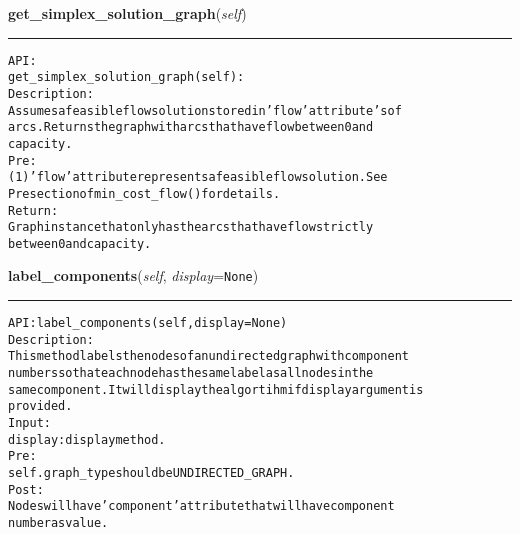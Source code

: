     \label{coinor:gimpy:graph:Graph:get_simplex_solution_graph}

    \vspace{0.5ex}

\hspace{.8\funcindent}\begin{boxedminipage}{\funcwidth}

    \raggedright \textbf{get\_simplex\_solution\_graph}(\textit{self})

    \vspace{-1.5ex}

    \rule{\textwidth}{0.5\fboxrule}
\setlength{\parskip}{2ex}
\begin{alltt}

API:
    get\_simplex\_solution\_graph(self):
Description:
    Assumes a feasible flow solution stored in 'flow' attribute's of
    arcs. Returns the graph with arcs that have flow between 0 and
    capacity.
Pre:
    (1) 'flow' attribute represents a feasible flow solution. See
    Pre section of min\_cost\_flow() for details.
Return:
    Graph instance that only has the arcs that have flow strictly
    between 0 and capacity.
\end{alltt}

\setlength{\parskip}{1ex}
    \end{boxedminipage}

    \label{coinor:gimpy:graph:Graph:label_components}

    \vspace{0.5ex}

\hspace{.8\funcindent}\begin{boxedminipage}{\funcwidth}

    \raggedright \textbf{label\_components}(\textit{self}, \textit{display}={\tt None})

    \vspace{-1.5ex}

    \rule{\textwidth}{0.5\fboxrule}
\setlength{\parskip}{2ex}
\begin{alltt}

API: label\_components(self, display=None)
Description:
This method labels the nodes of an undirected graph with component
numbers so that each node has the same label as all nodes in the
same component. It will display the algortihm if display argument is
provided.
Input:
    display: display method.
Pre:
    self.graph\_type should be UNDIRECTED\_GRAPH.
Post:
    Nodes will have 'component' attribute that will have component
    number as value.
\end{alltt}

\setlength{\parskip}{1ex}
    \end{boxedminipage}

